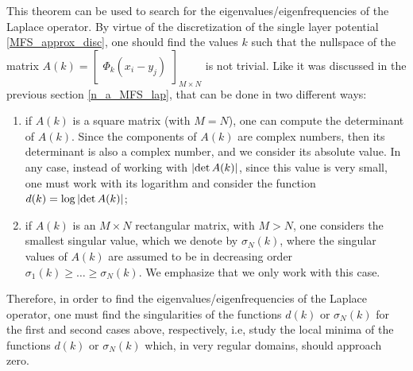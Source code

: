 This theorem can be used to search for the eigenvalues/eigenfrequencies of the Laplace operator. By virtue of the discretization of the single layer potential \eqref{MFS_approx_disc}, one should find the values \(k\) such that the nullspace of the matrix \(A(k) = \begin{bmatrix}
    \Phi_k(x_i - y_j)
\end{bmatrix}_{M \times N}\) is not trivial. Like it was discussed in the previous section \ref{n_a_MFS_lap}, that can be done in two different ways:
\begin{enumerate}
    \item if \(A(k)\) is a square matrix (with \(M=N\)), one can compute the determinant of \(A(k)\). Since the components of \(A(k)\) are complex numbers, then its determinant is also a complex number, and we consider its absolute value. In any case, instead of working with \(\abs{\determinant A(k)}\), since this value is very small, one must work with its logarithm and consider the function \(d(k) = \log \abs{\determinant A(k)}\);
    \item if \(A(k)\) is an \(M\times N\) rectangular matrix, with \(M > N\), one considers the smallest singular value, which we denote by \(\sigma_N(k)\), where the singular values of \(A(k)\) are assumed to be in decreasing order \(\sigma_1(k) \geq \dots \geq \sigma_N(k)\). We emphasize that we only work with this case.
\end{enumerate}
Therefore, in order to find the eigenvalues/eigenfrequencies of the Laplace operator, one must find the singularities of the functions \(d(k)\) or \(\sigma_N(k)\) for the first and second cases above, respectively, i.e, study the local minima of the functions \(d(k)\) or \(\sigma_N(k)\) which, in very regular domains, should approach zero.

